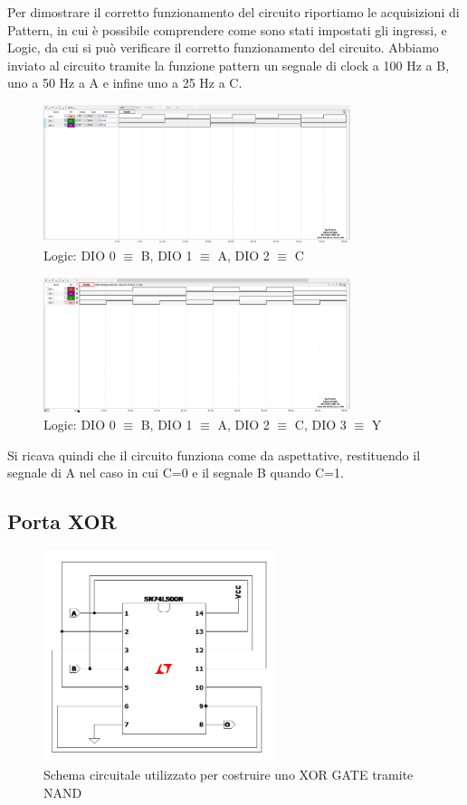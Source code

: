 \documentclass[10pt, a4paper, italian]{article}
\begin{document}
Per dimostrare il corretto funzionamento del circuito riportiamo le acquisizioni di Pattern, in cui è possibile comprendere come sono stati impostati gli ingressi, e Logic, da cui si può verificare il corretto funzionamento del circuito.
Abbiamo inviato al circuito tramite la funzione pattern un segnale di clock a 100 Hz a B, uno a 50 Hz a A e infine uno a 25 Hz a C.
\begin{figure}[htb!]
    \centering
    \includegraphics[width=0.8\textwidth]{pat2.png}
    \caption{Logic: DIO 0 $\equiv$ B, DIO 1 $\equiv$ A, DIO 2 $\equiv$ C}
    \label{logic2}
\end{figure}
\begin{figure}[htb!]
    \centering
    \includegraphics[width=0.8\textwidth]{Multiplex.png}
    \caption{Logic: DIO 0 $\equiv$ B, DIO 1 $\equiv$ A, DIO 2 $\equiv$ C, DIO 3 $\equiv$ Y}
    \label{logic2}
\end{figure}
Si ricava quindi che il circuito funziona come da aspettative, restituendo il segnale di A nel caso in cui C=0 e il segnale B quando C=1.


\subsection{Porta XOR}

\begin{figure}[htb!]
    \centering
    \includegraphics[width=0.6\textwidth]{NAND_XOR.png}
    \caption{Schema circuitale utilizzato per costruire uno XOR GATE tramite NAND}
    \label{circuito3}
\end{figure}
\end{document}

